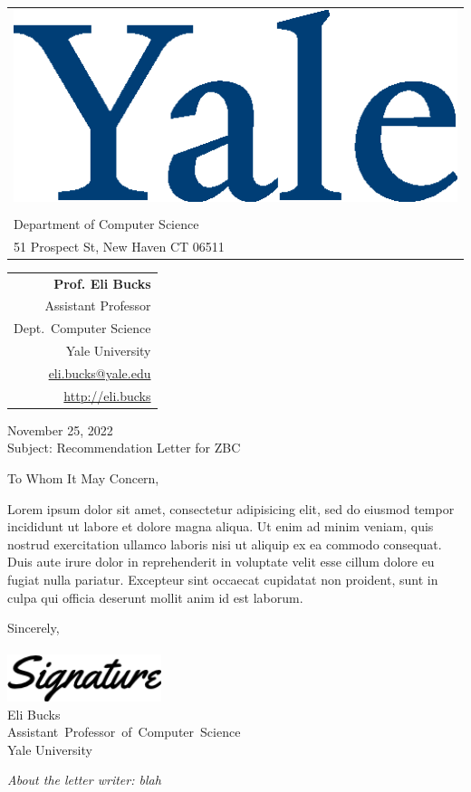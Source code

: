 \documentclass[letterpaper]{letter}
\date{}
\begin{document}
\begin{tabular}[t]{@{} l @{}}
    \includegraphics[height=3\normalbaselineskip,valign=t]{yale_newlogo_yaleblue.eps} \\
    \\
    \color{yaleblue} Department of Computer Science \\
    \color{yaleblue} 51 Prospect St, New Haven CT 06511
  \end{tabular}%
  \hfill
  \begin{tabular}[t]{@{} r @{}}
    \bfseries \color{yaleblue} Prof. Eli Bucks \\
    \color{yaleblue} Assistant Professor \\
    \color{yaleblue} Dept.\ Computer Science \\
    \color{yaleblue} Yale University \\
    \color{yaleblue} \url{eli.bucks@yale.edu} \\
    \color{yaleblue} \url{http://eli.bucks} \\
  \end{tabular}

\bigskip

November 25, 2022\\
Subject: Recommendation Letter for ZBC

\bigskip
To Whom It May Concern,

\bigskip


Lorem ipsum dolor sit amet, consectetur adipisicing elit, sed do eiusmod tempor incididunt ut labore et dolore magna aliqua. Ut enim ad minim veniam, quis nostrud exercitation ullamco laboris nisi ut aliquip ex ea commodo consequat. Duis aute irure dolor in reprehenderit in voluptate velit esse cillum dolore eu fugiat nulla pariatur. Excepteur sint occaecat cupidatat non proident, sunt in culpa qui officia deserunt mollit anim id est laborum.


\bigskip
Sincerely,\\
\bigskip\\
\includegraphics[width=4.5cm]{signature.png}\\
Eli Bucks \\
\mbox{Assistant Professor of Computer Science} \\
Yale University


\bigskip
{
\em About the letter writer: blah
}
\end{document}
